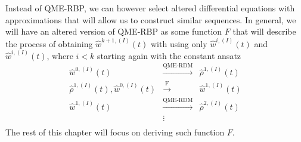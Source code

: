 Instead of QME-RBP, we can however select altered differential equations with approximations that will allow us to construct similar sequences. In general, we will have an altered version of QME-RBP as some function $F$ that will describe the process of obtaining $\hat{w}^{k+1,(I)}(t)$ with using only $\hat{w}^{i,(I)}(t)$ and $\hat{w}^{i,(I)}(t)$, where $i < k$ starting again with the constant ansatz 
\begin{equation}
    \begin{array}{rcl}
        \hat{w}^{0,(I)}(t) & \overset{\text{QME-RDM}}{\longrightarrow} & \hat{\rho}^{1,(I)}(t) \\
        \hat{\rho}^{1,(I)}(t), \hat{w}^{0,(I)}(t) & \overset{\text{F}}{\longrightarrow} &\hat{w}^{1,(I)}(t) \\
        \hat{w}^{1,(I)}(t) & \overset{\text{QME-RDM}}{\longrightarrow} &\hat{\rho}^{2,(I)}(t) \\
        &\vdots& \\
    \end{array}
\end{equation}
The rest of this chapter will focus on deriving such function $F$.

